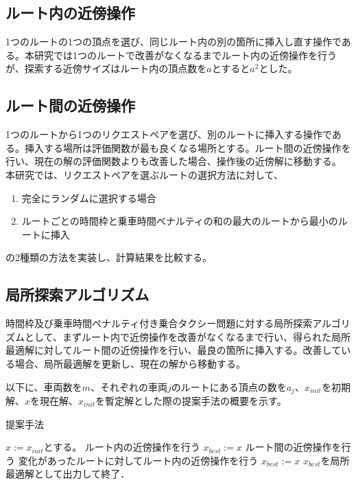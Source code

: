 \subsection{ルート内の近傍操作}
1つのルートの1つの頂点を選び、同じルート内の別の箇所に挿入し直す操作である。本研究では1つのルートで改善がなくなるまでルート内の近傍操作を行うが、探索する近傍サイズはルート内の頂点数を$a$とすると$a^2$とした。

\subsection{ルート間の近傍操作}
1つのルートから1つのリクエストペアを選び、別のルートに挿入する操作である。挿入する場所は評価関数が最も良くなる場所とする。ルート間の近傍操作を行い、現在の解の評価関数よりも改善した場合、操作後の近傍解に移動する。
本研究では、リクエストペアを選ぶルートの選択方法に対して、
\begin{enumerate}
 \item 完全にランダムに選択する場合
 \item ルートごとの時間枠と乗車時間ペナルティの和の最大のルートから最小のルートに挿入
\end{enumerate}
の2種類の方法を実装し、計算結果を比較する。
\subsection{局所探索アルゴリズム}
時間枠及び乗車時間ペナルティ付き乗合タクシー問題に対する局所探索アルゴリズムとして、まずルート内で近傍操作を改善がなくなるまで行い、得られた局所最適解に対してルート間の近傍操作を行い、最良の箇所に挿入する。改善している場合、局所最適解を更新し、現在の解から移動する。

以下に、車両数を$m$、それぞれの車両$j$のルートにある頂点の数を$a_j$、$x_{init}$を初期解、$x$を現在解、$x_{init}$を暫定解とした際の提案手法の概要を示す。
\begin{algorithm}
 \caption{提案手法}
 \label{algo1}
 \begin{algorithmic}[1]%
  \STATE $x := x_{init}$とする。
  \STATE ルート内の近傍操作を行う
  \STATE  $x_{best} := x$
  \ENDIF
  \ENDFOR
  \ENDFOR
  \STATE ルート間の近傍操作を行う
  \STATE 変化があったルートに対してルート内の近傍操作を行う
  \STATE  $x_{best} := x$
  \ENDIF
  \STATE $x_{best}$を局所最適解として出力して終了．
 \end{algorithmic}
\end{algorithm}
